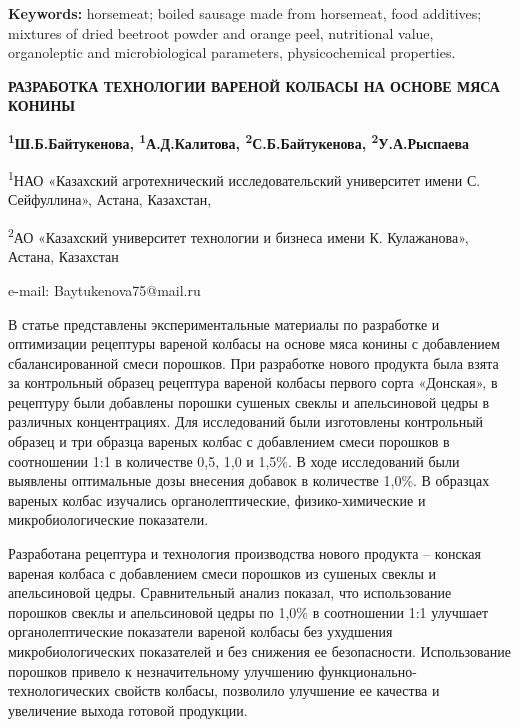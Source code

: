{\bfseries Keywords:} horsemeat; boiled sausage made from horsemeat, food
additives; mixtures of dried beetroot powder and orange peel,
nutritional value, organoleptic and microbiological parameters,
physicochemical properties.

\begin{articleheader}
{\bfseries РАЗРАБОТКА ТЕХНОЛОГИИ ВАРЕНОЙ КОЛБАСЫ НА ОСНОВЕ МЯСА КОНИНЫ}

{\bfseries
\textsuperscript{1}Ш.Б.Байтукенова\textsuperscript{\envelope },
\textsuperscript{1}А.Д.Калитова,
\textsuperscript{2}С.Б.Байтукенова,
\textsuperscript{2}У.А.Рыспаева
}
\end{articleheader}

\begin{affiliation}
\textsuperscript{1}НАО «Казахский агротехнический исследовательский
университет имени С. Сейфуллина», Астана, Казахстан,

\textsuperscript{2}АО «Казахский университет технологии и бизнеса имени
К. Кулажанова», Астана, Казахстан

e-mail: Baytukenova75@mail.ru
\end{affiliation}

В статье представлены экспериментальные материалы по разработке и
оптимизации рецептуры вареной колбасы на основе мяса конины с
добавлением сбалансированной смеси порошков. При разработке нового
продукта была взята за контрольный образец рецептура вареной колбасы
первого сорта «Донская», в рецептуру были добавлены порошки сушеных
свеклы и апельсиновой цедры в различных концентрациях. Для исследований
были изготовлены контрольный образец и три образца вареных колбас с
добавлением смеси порошков в соотношении 1:1 в количестве 0,5, 1,0 и
1,5\%. В ходе исследований были выявлены оптимальные дозы внесения
добавок в количестве 1,0\%. В образцах вареных колбас изучались
органолептические, физико-химические и микробиологические показатели.

Разработана рецептура и технология производства нового продукта --
конская вареная колбаса с добавлением смеси порошков из сушеных свеклы и
апельсиновой цедры. Сравнительный анализ показал, что использование
порошков свеклы и апельсиновой цедры по 1,0\% в соотношении 1:1 улучшает
органолептические показатели вареной колбасы без ухудшения
микробиологических показателей и без снижения ее безопасности.
Использование порошков привело к незначительному улучшению
функционально-технологических свойств колбасы, позволило улучшение ее
качества и увеличение выхода готовой продукции.

